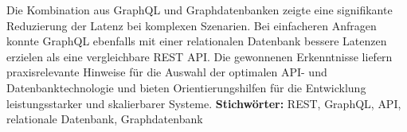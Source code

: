 \newline
\noindent
Die Kombination aus GraphQL und Graphdatenbanken zeigte eine signifikante Reduzierung der Latenz bei komplexen Szenarien. Bei einfacheren Anfragen konnte GraphQL ebenfalls mit einer relationalen Datenbank bessere Latenzen erzielen als eine vergleichbare REST API. Die gewonnenen Erkenntnisse liefern praxisrelevante Hinweise für die Auswahl der optimalen API- und Datenbanktechnologie und bieten Orientierungshilfen für die Entwicklung leistungsstarker und skalierbarer Systeme.
\newline
\noindent
\textbf{Stichwörter:} REST, GraphQL, API, relationale Datenbank, Graphdatenbank
